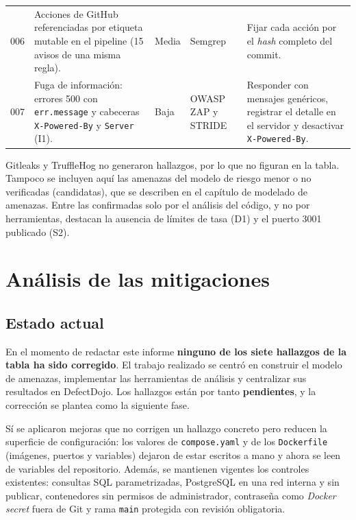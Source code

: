 \begin{longtable}{
    p{0.8cm}
    p{4.1cm}
    p{1.4cm}
    p{2.3cm}
    p{5.0cm}
}
006 & Acciones de GitHub referenciadas por etiqueta mutable en el pipeline
(15 avisos de una misma regla). &
Media & Semgrep &
Fijar cada acción por el \textit{hash} completo del commit. \\

007 & Fuga de información: errores 500 con \texttt{err.message} y
cabeceras \texttt{X-Powered-By} y \texttt{Server} (I1). &
Baja & OWASP ZAP y STRIDE &
Responder con mensajes genéricos, registrar el detalle en el servidor y
desactivar \texttt{X-Powered-By}. \\

\end{longtable}

Gitleaks y TruffleHog no generaron hallazgos, por lo que no figuran en la
tabla. Tampoco se incluyen aquí las amenazas del modelo de riesgo menor o no
verificadas (candidatas), que se describen en el capítulo de modelado de
amenazas. Entre las confirmadas solo por el análisis del código, y no por
herramientas, destacan la ausencia de límites de tasa (D1) y el puerto 3001
publicado (S2).

\section{Análisis de las mitigaciones}

\subsection{Estado actual}

En el momento de redactar este informe \textbf{ninguno de los siete
hallazgos de la tabla ha sido corregido}. El trabajo realizado se centró en
construir el modelo de amenazas, implementar las herramientas de análisis y
centralizar sus resultados en DefectDojo. Los hallazgos están por tanto
\textbf{pendientes}, y la corrección se plantea como la siguiente fase.

Sí se aplicaron mejoras que no corrigen un hallazgo concreto pero reducen la
superficie de configuración: los valores de \texttt{compose.yaml} y de los
\texttt{Dockerfile} (imágenes, puertos y variables) dejaron de estar escritos
a mano y ahora se leen de variables del repositorio. Además, se mantienen
vigentes los controles existentes: consultas SQL parametrizadas, PostgreSQL
en una red interna y sin publicar, contenedores sin permisos de
administrador, contraseña como \textit{Docker secret} fuera de Git y rama
\texttt{main} protegida con revisión obligatoria.

